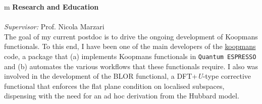\documentclass[10pt,a4paper,final]{article}
\begin{document}
\begin{tabularx}{\textwidth}{
   m{\dimexpr{}\tabcolsep}}
   \large\textbf{\textcolor{seaborn_bg_grey_half}{Research and Education}} \\
   \hbox{%
   } \\
   \textit{Supervisor:} Prof. Nicola Marzari
   \\
   The goal of my current postdoc is to drive the ongoing development of Koopmans functionals. To this end, I have been one of the main developers of the \href{https://koopmans-functionals.org/}{koopmans} code, a package that (a) implements Koopmans functionals in \texttt{Quantum ESPRESSO} and (b) automates the various workflows that these functionals require. I also was involved in the development of the BLOR functional, a DFT+\emph{U}-type corrective functional that enforces the flat plane condition on localised subspaces, dispensing with the need for an ad hoc derivation from the Hubbard model.
   \\

\end{tabularx}
\end{document}

